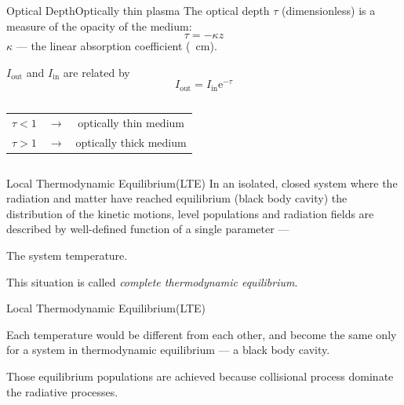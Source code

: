 \documentclass[]{beamer}
\begin{document}
\begin{frame}{Optical Depth}{Optically thin plasma}
  The optical depth $\tau$ (dimensionless) is a measure of the opacity of the medium:
  \begin{equation*}
    \tau=-\kappa z
  \end{equation*}
  $\kappa$ --- the linear absorption coefficient (\si{\per\cm}).

  $I_\text{out}$ and $I_\text{in}$ are related by
  \begin{equation*}
    I_\text{out} = I_\text{in}\mathrm{e}^{-\tau} %
  \end{equation*}
\begin{columns}
      
  \begin{center}
  \begin{tabular}{ c c c }
    $\tau<1$ & $\longrightarrow$ & optically thin medium\\ 
    $\tau>1$ & $\longrightarrow$ & optically thick medium
  \end{tabular}
  \end{center}
\end{columns}
\end{frame}
\newcommand{\lte}{Local Thermodynamic Equilibrium(LTE)}
\begin{frame}{\lte}
  In an isolated, closed system where the radiation and matter have reached equilibrium (black body cavity) the distribution of the kinetic motions, level populations and radiation fields are described by well-defined function of a single parameter ---

  The system temperature.

  This situation is called \emph{complete thermodynamic equilibrium}.
\end{frame}
\begin{frame}{\lte}
  \begin{center}
\end{center}
Each temperature would be different from each other, and become the same only for a system in thermodynamic equilibrium --- a black body cavity.

Those equilibrium populations are achieved because collisional process dominate the radiative processes.
\end{frame}
\end{document}
